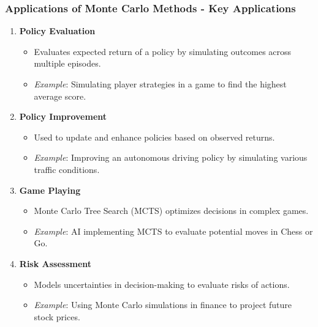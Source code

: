 \documentclass[aspectratio=169]{beamer}
\begin{document}
\begin{frame}[fragile]
    \frametitle{Applications of Monte Carlo Methods - Key Applications}
    \begin{enumerate}
        \item \textbf{Policy Evaluation}
            \begin{itemize}
                \item Evaluates expected return of a policy by simulating outcomes across multiple episodes.
                \item \textit{Example}: Simulating player strategies in a game to find the highest average score.
            \end{itemize}
    
        \item \textbf{Policy Improvement}
            \begin{itemize}
                \item Used to update and enhance policies based on observed returns.
                \item \textit{Example}: Improving an autonomous driving policy by simulating various traffic conditions.
            \end{itemize}

        \item \textbf{Game Playing}
            \begin{itemize}
                \item Monte Carlo Tree Search (MCTS) optimizes decisions in complex games.
                \item \textit{Example}: AI implementing MCTS to evaluate potential moves in Chess or Go.
            \end{itemize}

        \item \textbf{Risk Assessment}
            \begin{itemize}
                \item Models uncertainties in decision-making to evaluate risks of actions.
                \item \textit{Example}: Using Monte Carlo simulations in finance to project future stock prices.
            \end{itemize}
    \end{enumerate}
\end{frame}
\end{document}
